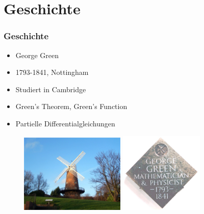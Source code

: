 \section{Geschichte}

\begin{frame}
\frametitle{Geschichte} 
	\begin{itemize}[<+->]
		\item George Green
		\item 1793-1841, Nottingham
		\item Studiert in Cambridge
		\item Green's Theorem, Green's Function
		\item Partielle Differentialgleichungen
	\end{itemize}
	
	\begin{figure}
	\centering
		\pause[6] \includegraphics[width=5cm]{./images/Greens_windmill}
		\pause[7] \includegraphics[width=4cm]{./images/george_green_plaque2}
	\end{figure}

\end{frame}


